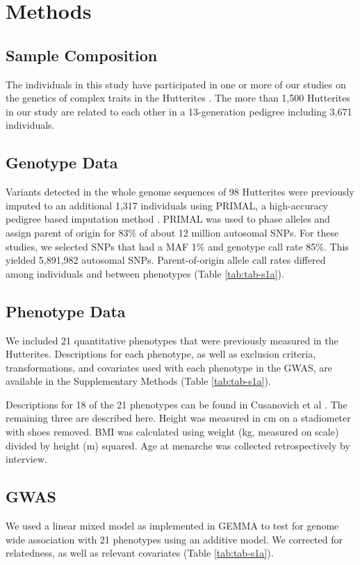 \section{Methods}\label{ch02-methods}

\subsection{Sample Composition}\label{Sample Composition}
The individuals in this study have participated in one or more of our studies on the genetics of complex traits in the Hutterites \cite{Cusanovich:2016id,Weiss:2005cq,Abney2001}. The more than 1,500 Hutterites in our study are related to each other in a 13-generation pedigree including 3,671 individuals. 

\subsection{Genotype Data}\label{Genotype Data}
Variants detected in the whole genome sequences of 98 Hutterites were previously imputed to an additional 1,317 individuals using PRIMAL, a high-accuracy pedigree based imputation method \cite{Livne2015}. PRIMAL was used to phase alleles and assign parent of origin for 83\% of about 12 million autosomal SNPs. For these studies, we selected SNPs that had a MAF 1\% and genotype call rate 85\%. This yielded 5,891,982 autosomal SNPs. Parent-of-origin allele call rates differed among individuals and between phenotypes (Table \ref{tab:tab-s1a}).

\subsection{Phenotype Data}\label{Phenotype Data}
We included 21 quantitative phenotypes that were previously measured in the Hutterites. Descriptions for each phenotype, as well as exclusion criteria, transformations, and covariates used with each phenotype in the GWAS, are available in the Supplementary Methods (Table \ref{tab:tab-s1a}). 

Descriptions for 18 of the 21 phenotypes can be found in Cusanovich et al \cite{Cusanovich:2016id}. The remaining three are described here. Height was measured in cm on a stadiometer with shoes removed. BMI was calculated using weight (kg, measured on scale) divided by height (m) squared. Age at menarche was collected retrospectively by interview. 

\subsection{GWAS}\label{GWAS Methods}
We used a linear mixed model as implemented in GEMMA to test for genome wide association with 21 phenotypes using an additive model. We corrected for relatedness, as well as relevant covariates (Table \ref{tab:tab-s1a}).


